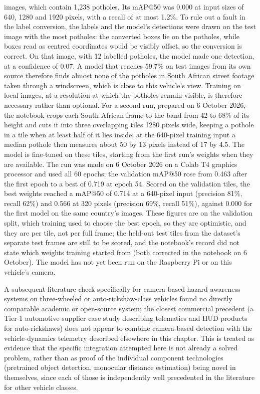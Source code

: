images, which contain 1,238 potholes. Its mAP@50 was 0.000 at input sizes of 640, 1280 and 1920 pixels, with a recall of at most 1.2\%. To rule out a fault in the label conversion, the labels and the model's detections were drawn on the test image with the most potholes: the converted boxes lie on the potholes, while boxes read as centred coordinates would be visibly offset, so the conversion is correct. On that image, with 12 labelled potholes, the model made one detection, at a confidence of 0.07. A model that reaches 59.7\% on test images from its own source therefore finds almost none of the potholes in South African street footage taken through a windscreen, which is close to this vehicle's view. Training on local images, at a resolution at which the potholes remain visible, is therefore necessary rather than optional. For a second run, prepared on 6 October 2026, the notebook crops each South African frame to the band from 42 to 68\% of its height and cuts it into three overlapping tiles 1280 pixels wide, keeping a pothole in a tile when at least half of it lies inside; at the 640-pixel training input a median pothole then measures about 50 by 13 pixels instead of 17 by 4.5. The model is fine-tuned on these tiles, starting from the first run's weights when they are available. The run was made on 6 October 2026 on a Colab T4 graphics processor and used all 60 epochs; the validation mAP@50 rose from 0.463 after the first epoch to a best of 0.719 at epoch 54. Scored on the validation tiles, the best weights reached a mAP@50 of 0.714 at a 640-pixel input (precision 81\%, recall 62\%) and 0.566 at 320 pixels (precision 69\%, recall 51\%), against 0.000 for the first model on the same country's images. These figures are on the validation split, which training used to choose the best epoch, so they are optimistic, and they are per tile, not per full frame; the held-out test tiles from the dataset's separate test frames are still to be scored, and the notebook's record did not state which weights training started from (both corrected in the notebook on 6 October). The model has not yet been run on the Raspberry Pi or on this vehicle's camera.

A subsequent literature check specifically for camera-based hazard-awareness systems on three-wheeled or auto-rickshaw-class vehicles found no directly comparable academic or open-source system; the closest commercial precedent (a Tier-1 automotive supplier case study describing telematics and HUD products for auto-rickshaws) does not appear to combine camera-based detection with the vehicle-dynamics telemetry described elsewhere in this chapter. This is treated as evidence that the specific integration attempted here is not already a solved problem, rather than as proof of the individual component technologies (pretrained object detection, monocular distance estimation) being novel in themselves, since each of those is independently well precedented in the literature for other vehicle classes.

